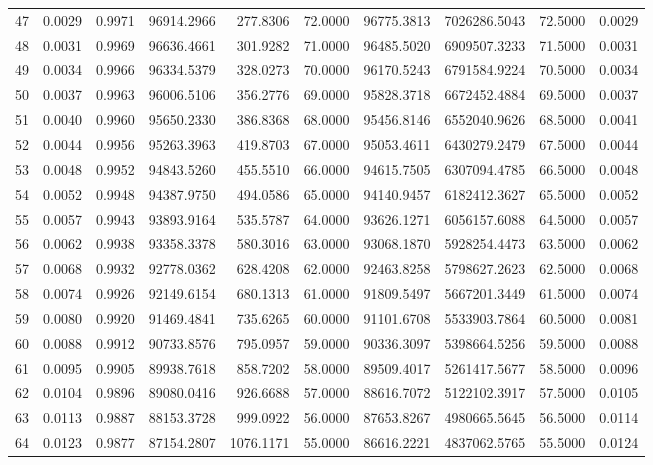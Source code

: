 \documentclass[11pt]{article}
\begin{document}
\begin{tabular}{|r|r|r|r|r|r|r|r|r|r|}
47 & 0.0029 & 0.9971 &  96914.2966 &  277.8306 &  72.0000 & 96775.3813 &  7026286.5043 &  72.5000 & 0.0029 \\
48 & 0.0031 & 0.9969 &  96636.4661 &  301.9282 &  71.0000 & 96485.5020 &  6909507.3233 &  71.5000 & 0.0031 \\
49 & 0.0034 & 0.9966 &  96334.5379 &  328.0273 &  70.0000 & 96170.5243 &  6791584.9224 &  70.5000 & 0.0034 \\
50 & 0.0037 & 0.9963 &  96006.5106 &  356.2776 &  69.0000 & 95828.3718 &  6672452.4884 &  69.5000 & 0.0037 \\
51 & 0.0040 & 0.9960 &  95650.2330 &  386.8368 &  68.0000 & 95456.8146 &  6552040.9626 &  68.5000 & 0.0041 \\
52 & 0.0044 & 0.9956 &  95263.3963 &  419.8703 &  67.0000 & 95053.4611 &  6430279.2479 &  67.5000 & 0.0044 \\
53 & 0.0048 & 0.9952 &  94843.5260 &  455.5510 &  66.0000 & 94615.7505 &  6307094.4785 &  66.5000 & 0.0048 \\
54 & 0.0052 & 0.9948 &  94387.9750 &  494.0586 &  65.0000 & 94140.9457 &  6182412.3627 &  65.5000 & 0.0052 \\
55 & 0.0057 & 0.9943 &  93893.9164 &  535.5787 &  64.0000 & 93626.1271 &  6056157.6088 &  64.5000 & 0.0057 \\
56 & 0.0062 & 0.9938 &  93358.3378 &  580.3016 &  63.0000 & 93068.1870 &  5928254.4473 &  63.5000 & 0.0062 \\
57 & 0.0068 & 0.9932 &  92778.0362 &  628.4208 &  62.0000 & 92463.8258 &  5798627.2623 &  62.5000 & 0.0068 \\
58 & 0.0074 & 0.9926 &  92149.6154 &  680.1313 &  61.0000 & 91809.5497 &  5667201.3449 &  61.5000 & 0.0074 \\
59 & 0.0080 & 0.9920 &  91469.4841 &  735.6265 &  60.0000 & 91101.6708 &  5533903.7864 &  60.5000 & 0.0081 \\
60 & 0.0088 & 0.9912 &  90733.8576 &  795.0957 &  59.0000 & 90336.3097 &  5398664.5256 &  59.5000 & 0.0088 \\
61 & 0.0095 & 0.9905 &  89938.7618 &  858.7202 &  58.0000 & 89509.4017 &  5261417.5677 &  58.5000 & 0.0096 \\
62 & 0.0104 & 0.9896 &  89080.0416 &  926.6688 &  57.0000 & 88616.7072 &  5122102.3917 &  57.5000 & 0.0105 \\
63 & 0.0113 & 0.9887 &  88153.3728 &  999.0922 &  56.0000 & 87653.8267 &  4980665.5645 &  56.5000 & 0.0114 \\
64 & 0.0123 & 0.9877 &  87154.2807 & 1076.1171 &  55.0000 & 86616.2221 &  4837062.5765 &  55.5000 & 0.0124 \\

\end{tabular}
\end{document}
